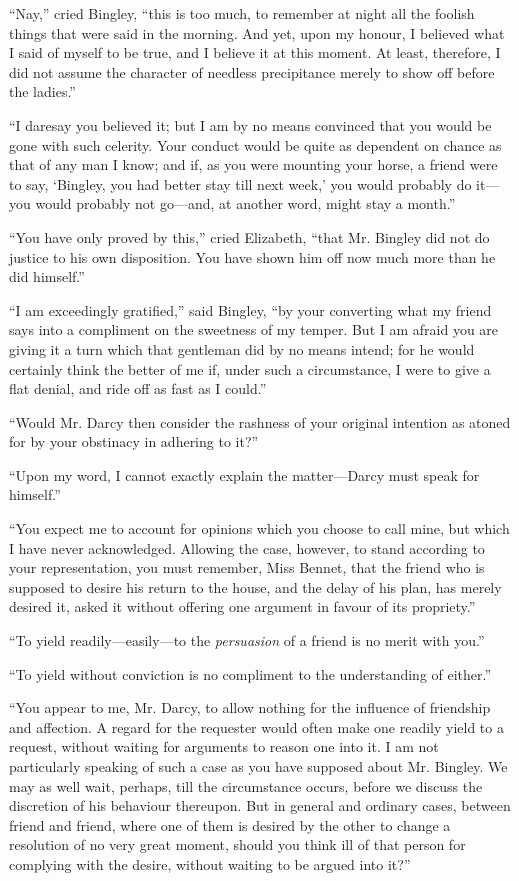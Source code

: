 \documentclass[12pt,openright]{book}
\begin{document}
“Nay,” cried Bingley, “this is too much, to remember at night all the foolish things that were said in the morning. And yet, upon my honour, I believed what I said of myself to be true, and I believe it at this moment. At least, therefore, I did not assume the character of needless precipitance merely to show off before the ladies.”

“I daresay you believed it; but I am by no means convinced that you would be gone with such celerity. Your conduct would be quite as dependent on chance as that of any man I know; and if, as you were mounting your horse, a friend were to say, ‘Bingley, you had better stay till next week,’ you would probably do it—you would probably not go—and, at another word, might stay a month.”

“You have only proved by this,” cried Elizabeth, “that Mr. Bingley did not do justice to his own disposition. You have shown him off now much more than he did himself.”

“I am exceedingly gratified,” said Bingley, “by your converting what my friend says into a compliment on the sweetness of my temper. But I am afraid you are giving it a turn which that gentleman did by no means intend; for he would certainly think the better of me if, under such a circumstance, I were to give a flat denial, and ride off as fast as I could.”

“Would Mr. Darcy then consider the rashness of your original intention as atoned for by your obstinacy in adhering to it?”

“Upon my word, I cannot exactly explain the matter—Darcy must speak for himself.”

“You expect me to account for opinions which you choose to call mine, but which I have never acknowledged. Allowing the case, however, to stand according to your representation, you must remember, Miss Bennet, that the friend who is supposed to desire his return to the house, and the delay of his plan, has merely desired it, asked it without offering one argument in favour of its propriety.”

“To yield readily—easily—to the \textit{persuasion} of a friend is no merit with you.”

“To yield without conviction is no compliment to the understanding of either.”

“You appear to me, Mr. Darcy, to allow nothing for the influence of friendship and affection. A regard for the requester would often make one readily yield to a request, without waiting for arguments to reason one into it. I am not particularly speaking of such a case as you have supposed about Mr. Bingley. We may as well wait, perhaps, till the circumstance occurs, before we discuss the discretion of his behaviour thereupon. But in general and ordinary cases, between friend and friend, where one of them is desired by the other to change a resolution of no very great moment, should you think ill of that person for complying with the desire, without waiting to be argued into it?”
\end{document}
